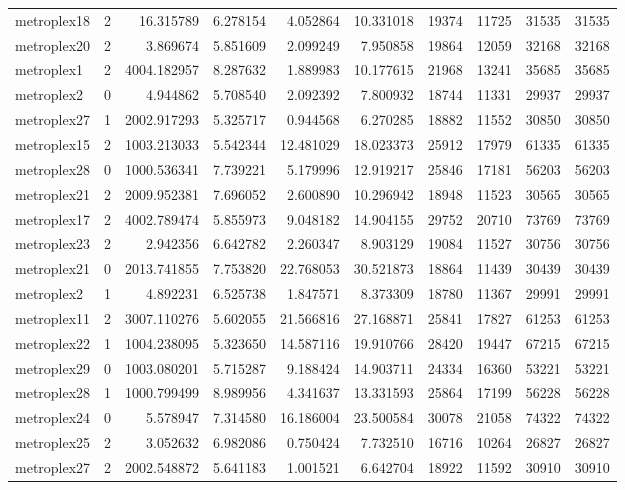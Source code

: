 \begin{longtable}{|l|r|r|r|r|r|r|r|r|r|}
metroplex18 & 2 & 16.315789 & 6.278154 & 4.052864 & 10.331018 & 19374 & 11725 & 31535 & 31535 \\
metroplex20 & 2 & 3.869674 & 5.851609 & 2.099249 & 7.950858 & 19864 & 12059 & 32168 & 32168 \\
metroplex1 & 2 & 4004.182957 & 8.287632 & 1.889983 & 10.177615 & 21968 & 13241 & 35685 & 35685 \\
metroplex2 & 0 & 4.944862 & 5.708540 & 2.092392 & 7.800932 & 18744 & 11331 & 29937 & 29937 \\
metroplex27 & 1 & 2002.917293 & 5.325717 & 0.944568 & 6.270285 & 18882 & 11552 & 30850 & 30850 \\
metroplex15 & 2 & 1003.213033 & 5.542344 & 12.481029 & 18.023373 & 25912 & 17979 & 61335 & 61335 \\
metroplex28 & 0 & 1000.536341 & 7.739221 & 5.179996 & 12.919217 & 25846 & 17181 & 56203 & 56203 \\
metroplex21 & 2 & 2009.952381 & 7.696052 & 2.600890 & 10.296942 & 18948 & 11523 & 30565 & 30565 \\
metroplex17 & 2 & 4002.789474 & 5.855973 & 9.048182 & 14.904155 & 29752 & 20710 & 73769 & 73769 \\
metroplex23 & 2 & 2.942356 & 6.642782 & 2.260347 & 8.903129 & 19084 & 11527 & 30756 & 30756 \\
metroplex21 & 0 & 2013.741855 & 7.753820 & 22.768053 & 30.521873 & 18864 & 11439 & 30439 & 30439 \\
metroplex2 & 1 & 4.892231 & 6.525738 & 1.847571 & 8.373309 & 18780 & 11367 & 29991 & 29991 \\
metroplex11 & 2 & 3007.110276 & 5.602055 & 21.566816 & 27.168871 & 25841 & 17827 & 61253 & 61253 \\
metroplex22 & 1 & 1004.238095 & 5.323650 & 14.587116 & 19.910766 & 28420 & 19447 & 67215 & 67215 \\
metroplex29 & 0 & 1003.080201 & 5.715287 & 9.188424 & 14.903711 & 24334 & 16360 & 53221 & 53221 \\
metroplex28 & 1 & 1000.799499 & 8.989956 & 4.341637 & 13.331593 & 25864 & 17199 & 56228 & 56228 \\
metroplex24 & 0 & 5.578947 & 7.314580 & 16.186004 & 23.500584 & 30078 & 21058 & 74322 & 74322 \\
metroplex25 & 2 & 3.052632 & 6.982086 & 0.750424 & 7.732510 & 16716 & 10264 & 26827 & 26827 \\
metroplex27 & 2 & 2002.548872 & 5.641183 & 1.001521 & 6.642704 & 18922 & 11592 & 30910 & 30910 \\

\end{longtable}
